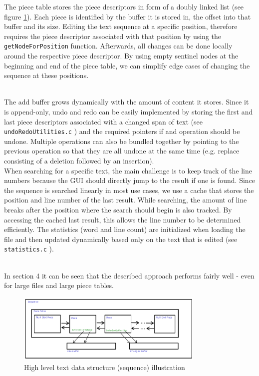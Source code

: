 The piece table stores the piece descriptors in form of a doubly linked list (see figure \ref{fig:sequence}). Each piece is identified by the buffer it is stored in, the offset into that buffer and its size. Editing the text sequence at a specific position, therefore requires the piece descriptor associated with that position by using the \verb|getNodeForPosition| function. Afterwards, all changes can be done locally around the respective piece descriptor. By using empty sentinel nodes at the beginning and end of the piece table, we can simplify edge cases of changing the sequence at these positions.

\noindent
\\The add buffer grows dynamically with the amount of content it stores. Since it is append-only, undo and redo can be easily implemented by storing the first and last piece descriptors associated with a changed span of text (see \verb|undoRedoUtilities.c| \cite{GithubRepo}) and the required pointers if and operation should be undone. Multiple operations can also be bundled together by pointing to the previous operation so that they are all undone at the same time (e.g. replace consisting of a deletion followed by an insertion). \\
When searching for a specific text, the main challenge is to keep track of the line numbers because the GUI should directly jump to the result if one is found. Since the sequence is searched linearly in most use cases, we use a cache that stores the position and line number of the last result. While searching, the amount of line breaks after the position where the search should begin is also tracked. By accessing the cached last result, this allows the line number to be determined efficiently. The statistics (word and line count) are initialized when loading the file and then updated dynamically based only on the text that is edited (see \verb|statistics.c| \cite{GithubRepo}). 

\noindent
\\In section 4 it can be seen that the described approach performs fairly well - even for large files and large piece tables.

\begin{figure}[H]
\centering
\includegraphics[width=0.8\textwidth]{./images/sequenceIllustration.png}
\caption{High level text data structure (sequence) illustration}
\label{fig:sequence}
\end{figure}

